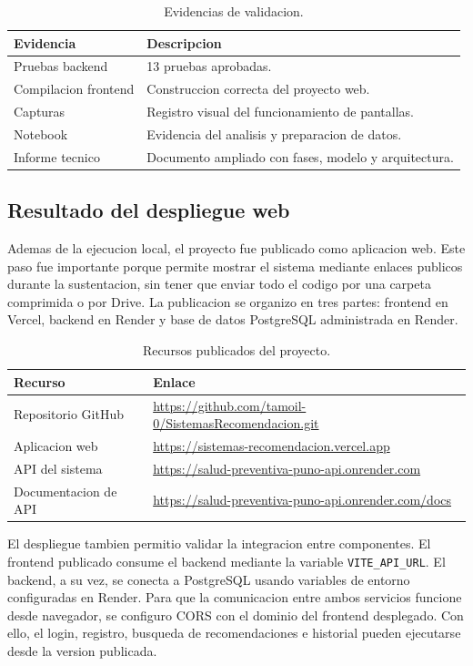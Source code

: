 \documentclass[12pt,a4paper]{article}
\begin{document}
\begin{table}[H]
\centering
\caption{Evidencias de validacion.}
\label{tab:evidencias_validacion}
\begin{tabular}{p{5cm}p{7.5cm}}
\toprule
Evidencia & Descripcion \\
\midrule
Pruebas backend & 13 pruebas aprobadas. \\
Compilacion frontend & Construccion correcta del proyecto web. \\
Capturas & Registro visual del funcionamiento de pantallas. \\
Notebook & Evidencia del analisis y preparacion de datos. \\
Informe tecnico & Documento ampliado con fases, modelo y arquitectura. \\
\bottomrule
\end{tabular}
\end{table}

\subsection{Resultado del despliegue web}
Ademas de la ejecucion local, el proyecto fue publicado como aplicacion web. Este paso fue importante porque permite mostrar el sistema mediante enlaces publicos durante la sustentacion, sin tener que enviar todo el codigo por una carpeta comprimida o por Drive. La publicacion se organizo en tres partes: frontend en Vercel, backend en Render y base de datos PostgreSQL administrada en Render.

\begin{table}[H]
\centering
\caption{Recursos publicados del proyecto.}
\label{tab:recursos_publicados}
\small
\begin{tabular}{p{3.8cm}p{8.5cm}}
\toprule
Recurso & Enlace \\ 
\midrule
Repositorio GitHub & \url{https://github.com/tamoil-0/SistemasRecomendacion.git} \\
Aplicacion web & \url{https://sistemas-recomendacion.vercel.app} \\
API del sistema & \url{https://salud-preventiva-puno-api.onrender.com} \\
Documentacion de API & \url{https://salud-preventiva-puno-api.onrender.com/docs} \\
\bottomrule
\end{tabular}
\end{table}

El despliegue tambien permitio validar la integracion entre componentes. El frontend publicado consume el backend mediante la variable \texttt{VITE\_API\_URL}. El backend, a su vez, se conecta a PostgreSQL usando variables de entorno configuradas en Render. Para que la comunicacion entre ambos servicios funcione desde navegador, se configuro CORS con el dominio del frontend desplegado. Con ello, el login, registro, busqueda de recomendaciones e historial pueden ejecutarse desde la version publicada.
\end{document}
